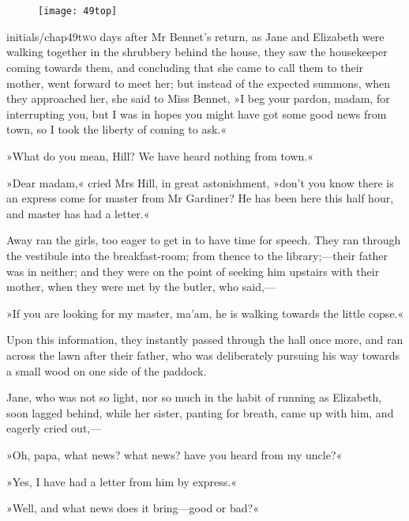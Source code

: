 \chapter[Chapter \thechapter]{}
	
	
\begin{figure}[t!]
\centering
\texttt{[image: 49top]}
\end{figure}


\lettrine[lines=6,image=true]{initials/chap49t}{wo}  days after Mr Bennet's return, as Jane and Elizabeth were walking together in the shrubbery behind the house, they saw the housekeeper coming towards them, and concluding that she came to call them to their mother, went forward to meet her; but instead of the expected summons, when they approached her, she said to Miss Bennet, »I beg your pardon, madam, for interrupting you, but I was in hopes you might have got some good news from town, so I took the liberty of coming to ask.«

»What do you mean, Hill? We have heard nothing from town.«

»Dear madam,« cried Mrs Hill, in great astonishment, »don't you know there is an express come for master from Mr Gardiner? He has been here this half hour, and master has had a letter.«

Away ran the girls, too eager to get in to have time for speech. They ran through the vestibule into the breakfast-room; from thence to the library;—their father was in neither; and they were on the point of seeking him upstairs with their mother, when they were met by the butler, who said,—

»If you are looking for my master, ma'am, he is walking towards the little copse.«

Upon this information, they instantly passed through the hall once more, and ran across the lawn after their father, who was deliberately pursuing his way towards a small wood on one side of the paddock.

Jane, who was not so light, nor so much in the habit of running as Elizabeth, soon lagged behind, while her sister, panting for breath, came up with him, and eagerly cried out,—

»Oh, papa, what news? what news? have you heard from my uncle?«

»Yes, I have had a letter from him by express.«

»Well, and what news does it bring—good or bad?«

